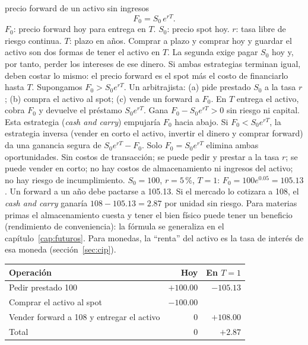 \begin{ficha}{precio forward de un activo sin ingresos}
\[ F_0=S_0\,e^{rT}. \]
 $F_0$: precio forward hoy para entrega en $T$. $S_0$: precio spot hoy. $r$: tasa libre de riesgo continua. $T$: plazo en años.
 Comprar a plazo y comprar hoy y guardar el activo son dos formas de tener el activo en $T$. La segunda exige pagar $S_0$ hoy y, por tanto, perder los intereses de ese dinero. Si ambas estrategias terminan igual, deben costar lo mismo: el precio forward es el spot más el costo de financiarlo hasta $T$.
 Supongamos $F_0>S_0e^{rT}$. Un arbitrajista: (a) pide prestado $S_0$ a la tasa $r$; (b) compra el activo al spot; (c) vende un forward a $F_0$. En $T$ entrega el activo, cobra $F_0$ y devuelve el préstamo $S_0e^{rT}$. Gana $F_0-S_0e^{rT}>0$ sin riesgo ni capital. Esta estrategia (\emph{cash and carry}) empujaría $F_0$ hacia abajo. Si $F_0<S_0e^{rT}$, la estrategia inversa (vender en corto el activo, invertir el dinero y comprar forward) da una ganancia segura de $S_0e^{rT}-F_0$. Solo $F_0=S_0e^{rT}$ elimina ambas oportunidades.
 Sin costos de transacción; se puede pedir y prestar a la tasa $r$; se puede vender en corto; no hay costos de almacenamiento ni ingresos del activo; no hay riesgo de incumplimiento.
 $S_0=100$, $r=5\,\%$, $T=1$: $F_0=100e^{0.05}=105.13$.
 Un forward a un año debe pactarse a 105.13. Si el mercado lo cotizara a 108, el \emph{cash and carry} ganaría $108-105.13=2.87$ por unidad sin riesgo.
 Para materias primas el almacenamiento cuesta y tener el bien físico puede tener un beneficio (rendimiento de conveniencia): la fórmula se generaliza en el capítulo~\ref{cap:futuros}. Para monedas, la \enquote{renta} del activo es la tasa de interés de esa moneda (sección~\ref{sec:cip}).
\end{ficha}

\begin{center}\small
{}
\begin{tabularx}{\linewidth}{@{}>{\raggedright\arraybackslash}Xrr@{}}
\toprule
Operación & Hoy & En $T=1$\\
\midrule
Pedir prestado 100 & $+100.00$ & $-105.13$\\
Comprar el activo al spot & $-100.00$ & \\
Vender forward a 108 y entregar el activo & 0 & $+108.00$\\
\midrule
Total & 0 & $+2.87$\\
\bottomrule
\end{tabularx}
\end{center}

